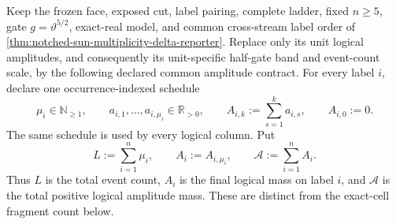 \begin{theorem}
\label{thm:notched-sun-amplitude-delta-reporter}
Keep the frozen face, exposed cut, label pairing, complete ladder, fixed
$n\geq5$, gate $g=\vartheta^{5/2}$, exact-real model, and common
cross-stream label order of
\cref{thm:notched-sun-multiplicity-delta-reporter}.  Replace only its unit
logical amplitudes, and consequently its unit-specific half-gate band and
event-count scale, by the following declared common amplitude contract.
For every label $i$, declare one occurrence-indexed schedule
\begin{equation}
 \mu_i\in\mathbb N_{\geq1},
 \qquad
 a_{i,1},\ldots,a_{i,\mu_i}\in\mathbb R_{>0},
 \qquad
 A_{i,k}:=\sum_{s=1}^{k}a_{i,s},
 \qquad A_{i,0}:=0.
 \label{eq:notched-sun-amplitude-schedule}
\end{equation}
The same schedule is used by every logical column.  Put
\begin{equation}
 L:=\sum_{i=1}^{n}\mu_i,
 \qquad A_i:=A_{i,\mu_i},
 \qquad \mathcal A:=\sum_{i=1}^{n}A_i.
 \label{eq:notched-sun-amplitude-total-mass}
\end{equation}
Thus $L$ is the total event count, $A_i$ is the final logical mass on label
$i$, and $\mathcal A$ is the total positive logical amplitude mass.  These
are distinct from the exact-cell fragment count below.


\end{theorem}
